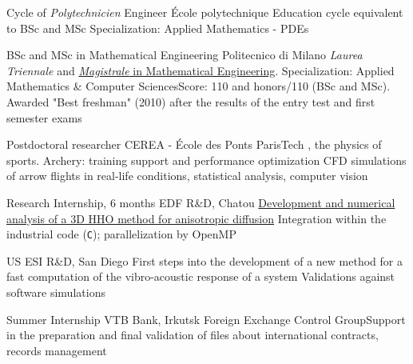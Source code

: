 \documentclass[english]{RMcv}
\begin{document}

%
%
        {Cycle of \textit{Polytechnicien} Engineer}%
        {\'Ecole polytechnique}%
        {Education cycle equivalent to BSc and MSc}%
        {Specialization: Applied Mathematics - PDEs}


%
%
        {BSc and MSc in Mathematical Engineering}%
        {Politecnico di Milano}%
        {\emph{Laurea Triennale} and \href{\tesilink}{\emph{Magistrale} in Mathematical Engineering}. Specialization: Applied Mathematics \& Computer Sciences}{Score: 110 and honors/110 (BSc and MSc). Awarded "Best freshman" (2010) after the results of the entry test and first semester exams}

\vspace{8pt}


%
        {Postdoctoral researcher}%
        {CEREA - \'Ecole des Ponts ParisTech}%
        {\SciencesJOhref{}, the physics of sports. Archery: training support and performance optimization}%
        {CFD simulations of arrow flights in real-life conditions, statistical analysis, computer vision}

%
%
        {Research Internship, 6 months}%
        {EDF R\&D, Chatou}%
        {\href{\tesilink}{Development and numerical analysis of a 3D HHO method for anisotropic diffusion}}%
        {Integration within the industrial code \cs{} (\texttt{C}); parallelization by OpenMP}


%
%
        {US ESI R\&D, San Diego}%
        {First steps into the development of a new method for a fast computation of the vibro-acoustic response of a system}%
        {Validations against software simulations}


%
%
        {Summer Internship}%
        {VTB Bank, Irkutsk}%
        {Foreign Exchange Control Group}{Support in the preparation and final validation of files about international contracts, records management}
\end{document}

